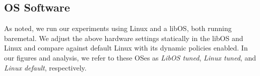          




\subsection{OS Software}
\label{sec:OS}
As noted, we run our experiments using
Linux and a libOS, both running baremetal.
We adjust the above hardware settings statically in the libOS and Linux and compare
against default Linux with its dynamic policies enabled.
In our figures and analysis,
we refer to these OSes as \textit{LibOS tuned},
\textit{Linux tuned}, and \textit{Linux default}, respectively.


